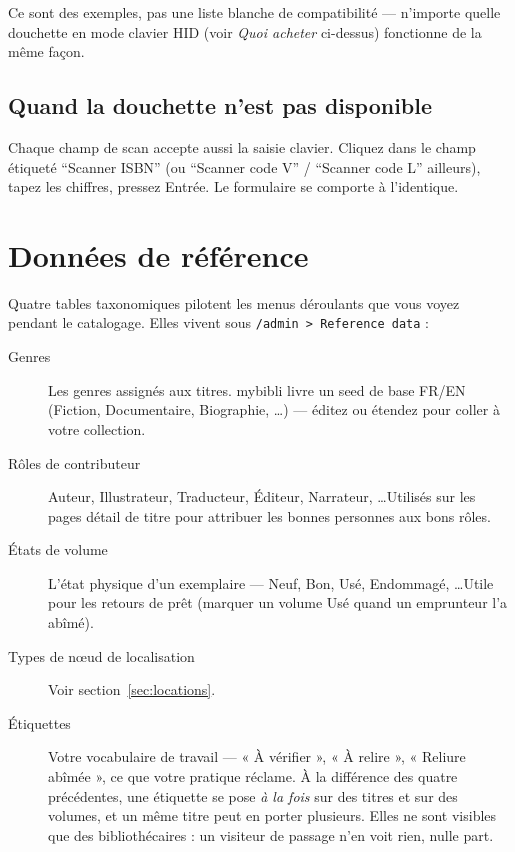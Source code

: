 Ce sont des exemples, pas une liste blanche de compatibilité —
n'importe quelle douchette en mode clavier HID (voir \emph{Quoi
acheter} ci-dessus) fonctionne de la même façon.

\subsection*{Quand la douchette n'est pas disponible}

Chaque champ de scan accepte aussi la saisie clavier. Cliquez dans
le champ étiqueté ``Scanner ISBN'' (ou ``Scanner code V'' /
``Scanner code L'' ailleurs), tapez les chiffres, pressez Entrée. Le
formulaire se comporte à l'identique.

\section{Données de référence}\label{sec:reference-data}

Quatre tables taxonomiques pilotent les menus déroulants que vous
voyez pendant le catalogage. Elles vivent sous \texttt{/admin >
Reference data} :

\begin{description}
  \item[Genres] Les genres assignés aux titres.
        mybibli livre un seed de base FR/EN (Fiction, Documentaire,
        Biographie, \dots) — éditez ou étendez pour coller à votre
        collection.
  \item[Rôles de contributeur] Auteur,
        Illustrateur, Traducteur, Éditeur, Narrateur, \dots Utilisés
        sur les pages détail de titre pour attribuer les bonnes
        personnes aux bons rôles.
  \item[États de volume] L'état physique d'un
        exemplaire — Neuf, Bon, Usé, Endommagé, \dots Utile pour les
        retours de prêt (marquer un volume Usé quand un emprunteur
        l'a abîmé).
  \item[Types de nœud de localisation] Voir
        section~\ref{sec:locations}.
  \item[Étiquettes] Votre vocabulaire de travail
        \string— « À vérifier », « À relire », « Reliure abîmée »,
        ce que votre pratique réclame. À la différence des quatre
        précédentes, une étiquette se pose \emph{à la fois} sur des
        titres et sur des volumes, et un même titre peut en porter
        plusieurs. Elles ne sont visibles que des bibliothécaires :
        un visiteur de passage n'en voit rien, nulle part.
\end{description}

